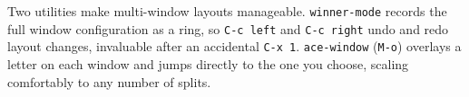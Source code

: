 Two utilities make multi-window layouts manageable.  \texttt{winner-mode} records the full window configuration as a ring, so \texttt{C-c left} and \texttt{C-c right} undo and redo layout changes, invaluable after an accidental \texttt{C-x 1}.  \texttt{ace-window} (\texttt{M-o}) overlays a letter on each window and jumps directly to the one you choose, scaling comfortably to any number of splits.
